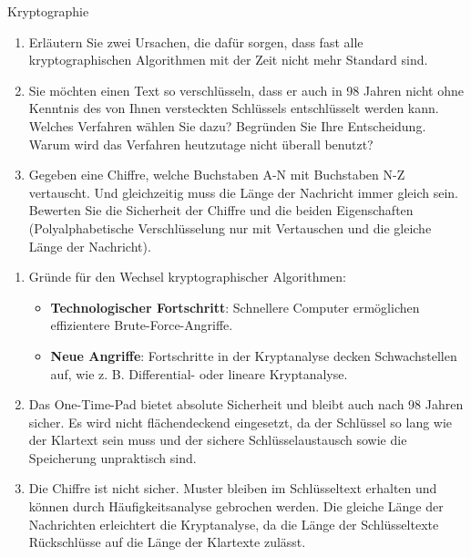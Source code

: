 \documentclass{article}
\begin{document}
\begin{exercise}{Kryptographie}
 \begin{enumerate}
    \item Erläutern Sie zwei Ursachen, die dafür sorgen, dass fast alle kryptographischen Algorithmen mit der Zeit nicht mehr Standard sind.
    \item Sie möchten einen Text so verschlüsseln, dass er auch in 98 Jahren nicht ohne Kenntnis des von Ihnen versteckten Schlüssels entschlüsselt werden kann. Welches Verfahren wählen Sie dazu? Begründen Sie Ihre Entscheidung. Warum wird das Verfahren heutzutage nicht überall benutzt?
    \item Gegeben eine Chiffre, welche Buchstaben A-N mit Buchstaben N-Z vertauscht. Und gleichzeitig muss die Länge der Nachricht immer gleich sein. Bewerten Sie die Sicherheit der Chiffre und die beiden Eigenschaften (Polyalphabetische Verschlüsselung nur mit Vertauschen und die gleiche Länge der Nachricht).
 \end{enumerate}

  \begin{solution}
    \begin{enumerate}
        \item Gründe für den Wechsel kryptographischer Algorithmen:
          \begin{itemize}
              \item \textbf{Technologischer Fortschritt}: Schnellere Computer ermöglichen effizientere Brute-Force-Angriffe.
              \item \textbf{Neue Angriffe}: Fortschritte in der Kryptanalyse decken Schwachstellen auf, wie z. B. Differential- oder lineare Kryptanalyse.
          \end{itemize}
        \item Das One-Time-Pad bietet absolute Sicherheit und bleibt auch nach 98 Jahren sicher. Es wird nicht flächendeckend eingesetzt, da der Schlüssel so lang wie der Klartext sein muss und der sichere Schlüsselaustausch sowie die Speicherung unpraktisch sind.
        \item Die Chiffre ist nicht sicher. Muster bleiben im Schlüsseltext erhalten und können durch Häufigkeitsanalyse gebrochen werden. Die gleiche Länge der Nachrichten erleichtert die Kryptanalyse, da die Länge der Schlüsseltexte Rückschlüsse auf die Länge der Klartexte zulässt.
    \end{enumerate}
  \end{solution}
\end{exercise}
\end{document}
